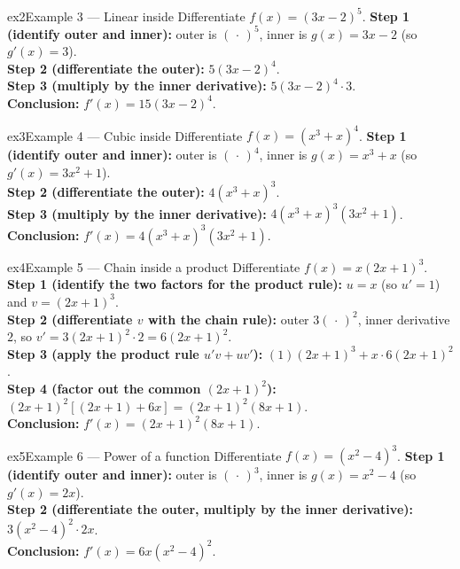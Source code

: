 \documentclass[11pt]{article}
\begin{document}
\begin{example}{ex2}{Example 3 --- Linear inside}
Differentiate $f(x)=(3x-2)^5$.\soln
\textbf{Step 1 (identify outer and inner):} outer is $(\,\cdot\,)^5$, inner is $g(x)=3x-2$ (so $g'(x)=3$).\\[3pt]
\textbf{Step 2 (differentiate the outer):} $5(3x-2)^4$.\\[3pt]
\textbf{Step 3 (multiply by the inner derivative):} $5(3x-2)^4\cdot3$.\\[3pt]
\textbf{Conclusion:} $f'(x)=15(3x-2)^4$.
\end{example}

\begin{example}{ex3}{Example 4 --- Cubic inside}
Differentiate $f(x)=(x^3+x)^4$.\soln
\textbf{Step 1 (identify outer and inner):} outer is $(\,\cdot\,)^4$, inner is $g(x)=x^3+x$ (so $g'(x)=3x^2+1$).\\[3pt]
\textbf{Step 2 (differentiate the outer):} $4(x^3+x)^3$.\\[3pt]
\textbf{Step 3 (multiply by the inner derivative):} $4(x^3+x)^3(3x^2+1)$.\\[3pt]
\textbf{Conclusion:} $f'(x)=4(x^3+x)^3(3x^2+1)$.
\end{example}

\begin{example}{ex4}{Example 5 --- Chain inside a product}
Differentiate $f(x)=x(2x+1)^3$.\soln
\textbf{Step 1 (identify the two factors for the product rule):} $u=x$ (so $u'=1$) and $v=(2x+1)^3$.\\[3pt]
\textbf{Step 2 (differentiate $v$ with the chain rule):} outer $3(\,\cdot\,)^2$, inner derivative $2$, so $v'=3(2x+1)^2\cdot2=6(2x+1)^2$.\\[3pt]
\textbf{Step 3 (apply the product rule $u'v+uv'$):} $(1)(2x+1)^3+x\cdot6(2x+1)^2$.\\[3pt]
\textbf{Step 4 (factor out the common $(2x+1)^2$):} $(2x+1)^2\left[(2x+1)+6x\right]=(2x+1)^2(8x+1)$.\\[3pt]
\textbf{Conclusion:} $f'(x)=(2x+1)^2(8x+1)$.
\end{example}

\begin{example}{ex5}{Example 6 --- Power of a function}
Differentiate $f(x)=(x^2-4)^3$.\soln
\textbf{Step 1 (identify outer and inner):} outer is $(\,\cdot\,)^3$, inner is $g(x)=x^2-4$ (so $g'(x)=2x$).\\[3pt]
\textbf{Step 2 (differentiate the outer, multiply by the inner derivative):} $3(x^2-4)^2\cdot2x$.\\[3pt]
\textbf{Conclusion:} $f'(x)=6x(x^2-4)^2$.
\end{example}
\end{document}
